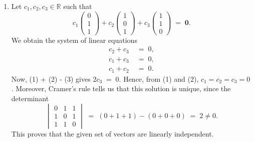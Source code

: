 \documentclass[10pt]{article}
\let\vec\mathbf
\begin{document}
\begin{enumerate}
                \item Let $c_1, c_2, c_3 \in \mathbb{R}$ such that
                \[
                c_1\begin{pmatrix}0\\1\\1\end{pmatrix} +
                c_2\begin{pmatrix}1\\0\\1\end{pmatrix} +
                c_3\begin{pmatrix}1\\1\\0\end{pmatrix} \;=\; \vec{0}.
                \]
                We obtain the system of linear equations
                \begin{align*}
                        c_2 + c_3 \;&=\; 0, \tag{1}\\
                        c_1 + c_3 \;&=\; 0, \tag{2}\\
                        c_1 + c_2 \;&=\; 0. \tag{3}
                \end{align*}
                Now, (1) + (2) - (3) gives $2c_3 \;=\; 0$. Hence, from (1) and (2), $c_1 = c_2 = c_3 = 0$. 
                Moreover, Cramer's rule tells us that this solution is unique, since the determinant
                \[
                \begin{vmatrix}
                        0 & 1 & 1 \\ 1 & 0 & 1\\ 1 & 1 & 0
                \end{vmatrix} \;=\; (0 + 1 + 1) - (0 + 0 + 0) \;=\; 2 \neq 0.
                \]
                This proves that the given set of vectors are linearly independent.


\end{enumerate}
\end{document}
